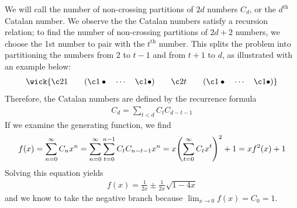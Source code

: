 \documentclass[11pt]{article}
\theoremstyle{definition}
\begin{document}
We will call the number of non-crossing partitions of $2d$ numbers $C_d$, or the $d^{\text{th}}$ Catalan number. We observe the the Catalan numbers satisfy a recursion relation; to find the number of non-crossing partitions of $2d + 2$ numbers, we choose the 1st number to pair with the $t^{\text{th}}$ number. This splits the problem into partitioning the numbers from 2 to $t-1$ and from $t+1$ to $d$, as illustrated with an example below:
\begin{align}
\wick{\c2 1 \qquad(\c1\bullet\quad \cdots \quad\c1\bullet)\qquad \c2 t \qquad(\c1 \bullet \quad\cdots\quad \c1 \bullet)}
\end{align}
Therefore, the Catalan numbers are defined by the recurrence formula
\begin{align}
C_d = \sum_{t<d} C_{t}C_{d-t-1}
\end{align}
If we examine the generating function, we find
\begin{align}
f(x) = \sum_{n = 0}^\infty C_nx^n = 
\sum_{n = 0}^\infty \sum_{t = 0}^{n-1}C_tC_{n-t-1} x^{n} = x\qty(\sum_{t = 0}^\infty C_tx^t)^2 +1 = xf^2(x) + 1
\end{align}
Solving this equation yields
\begin{align}
f(x) = \frac{1}{2x} \pm \frac{1}{2x}\sqrt{1 - 4x}
\end{align}
and we know to take the negative branch because $\lim_{x\to 0}f(x) = C_0 = 1$.
\end{document}
